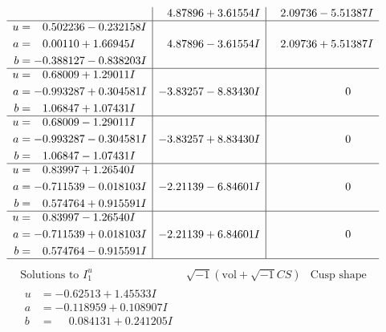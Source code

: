\documentclass[1p]{elsarticle_modified}
\theoremstyle{definition}
\newcommand{\I}{\sqrt{-1}}
\begin{document}
$$\begin{array}{c|c|c}
 & \phantom{-}4.87896 + 3.61554 I & \phantom{-}2.09736 - 5.51387 I \\ \hline\begin{aligned}
u &= \phantom{-}0.502236 - 0.232158 I \\
a &= \phantom{-}0.00110 + 1.66945 I \\
b &= -0.388127 - 0.838203 I\end{aligned}
 & \phantom{-}4.87896 - 3.61554 I & \phantom{-}2.09736 + 5.51387 I \\ \hline\begin{aligned}
u &= \phantom{-}0.68009 + 1.29011 I \\
a &= -0.993287 + 0.304581 I \\
b &= \phantom{-}1.06847 + 1.07431 I\end{aligned}
 & -3.83257 - 8.83430 I & \phantom{-0.000000 } 0 \\ \hline\begin{aligned}
u &= \phantom{-}0.68009 - 1.29011 I \\
a &= -0.993287 - 0.304581 I \\
b &= \phantom{-}1.06847 - 1.07431 I\end{aligned}
 & -3.83257 + 8.83430 I & \phantom{-0.000000 } 0 \\ \hline\begin{aligned}
u &= \phantom{-}0.83997 + 1.26540 I \\
a &= -0.711539 - 0.018103 I \\
b &= \phantom{-}0.574764 + 0.915591 I\end{aligned}
 & -2.21139 - 6.84601 I & \phantom{-0.000000 } 0 \\ \hline\begin{aligned}
u &= \phantom{-}0.83997 - 1.26540 I \\
a &= -0.711539 + 0.018103 I \\
b &= \phantom{-}0.574764 - 0.915591 I\end{aligned}
 & -2.21139 + 6.84601 I & \phantom{-0.000000 } 0\\
 \hline 
 \end{array}$$\newpage$$\begin{array}{c|c|c}  
\text{Solutions to }I^u_{1}& \I (\text{vol} + \sqrt{-1}CS) & \text{Cusp shape}\\
 \hline 
\begin{aligned}
u &= -0.62513 + 1.45533 I \\
a &= -0.118959 + 0.108907 I \\
b &= \phantom{-}0.084131 + 0.241205 I\end{aligned}

\end{array}$$
\end{document}
